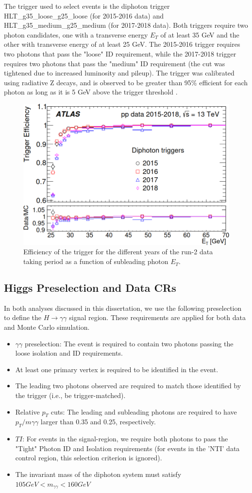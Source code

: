 The trigger used to select events is the diphoton trigger HLT\_g35\_loose\_g25\_loose (for 2015-2016 data) and HLT\_g35\_medium\_g25\_medium (for 2017-2018 data). Both triggers require two photon candidates, one with a transverse energy $E_{T}$ of at least 35 GeV and the other with transverse energy of at least 25 GeV. The 2015-2016 trigger requires two photons that pass the "loose" ID requirement, while the 2017-2018 trigger requires two photons that pass the "medium" ID requirement (the cut was tightened due to increased luminosity and pileup). The trigger was calibrated using radiative Z decays, and is observed to be greater than 95\% efficient for each photon as long as it is 5 GeV above the trigger threshold \cite{triggerperformance}.

\begin{figure}
\includegraphics[width=0.5\linewidth]{figures/datamc_chapter/trigger.png}
\caption{Efficiency of the trigger for the different years of the run-2 data taking period as a function of subleading photon $E_{T}$.}
\end{figure}

\subsection{Higgs Preselection and Data CRs} \label{sec:Preselection} 

In both analyses discussed in this dissertation, we use the following preselection to define the $H \rightarrow \gamma \gamma$ signal region. These requirements are applied for both data and Monte Carlo simulation. 

\begin{itemize}
\item $\gamma\gamma$ preselection: The event is required to contain two photons passing the loose isolation and ID requirements.
\item At least one primary vertex is required to be identified in the event.
\item The leading two photons observed are required to match those identified by the trigger (i.e., be trigger-matched).
\item Relative $p_{T}$ cuts: The leading and subleading photons are required to have $p_{T}/m\gamma\gamma$ larger than 0.35 and 0.25, respectively.
\item $TI$: For events in the signal-region, we require both photons to pass the "Tight" Photon ID and Isolation requirements (for events in the 'NTI' data control region, this selection criterion is ignored). 
\item The invariant mass of the diphoton system must satisfy $105 GeV < m_{\gamma\gamma} < 160 GeV$
\end{itemize}

